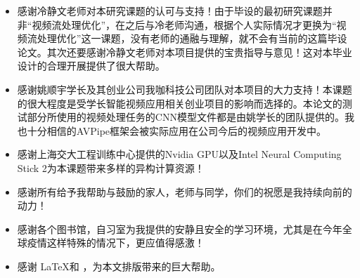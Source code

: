 

\begin{acknowledgements}
\begin{itemize}

\item 感谢冷静文老师对本研究课题的认可与支持！由于毕设的最初研究课题并非“视频流处理优化”，在之后与冷老师沟通，根据个人实际情况才更换为“视频流处理优化”这一课题，没有老师的通融与理解，就不会有当前的这篇毕设论文。其次还要感谢冷静文老师对本项目提供的宝贵指导与意见！这对本毕业设计的合理开展提供了很大帮助。
  
\item 感谢姚顺宇学长及其创业公司我咖科技公司团队对本项目的大力支持！本课题的很大程度是受学长智能视频应用相关创业项目的影响而选择的。本论文的测试部分所使用的视频处理任务的CNN模型文件都是由姚学长的团队提供的。我也十分相信的AVPipe框架会被实际应用在公司今后的视频应用开发中。
  
\item 感谢上海交大工程训练中心提供的Nvidia GPU以及Intel Neural Computing Stick 2为本课题带来多样的异构计算资源！
  
\item 感谢所有给予我帮助与鼓励的家人，老师与同学，你们的祝愿是我持续向前的动力！
  
\item 感谢各个图书馆，自习室为我提供的安静且安全的学习环境，尤其是在今年全球疫情这样特殊的情况下，更应值得感激！

\item 感谢 \LaTeX 和 \href{https://github.com/sjtug/SJTUThesis}{\sjtuthesis}，为本文排版带来的巨大帮助。

\end{itemize}
\end{acknowledgements}

